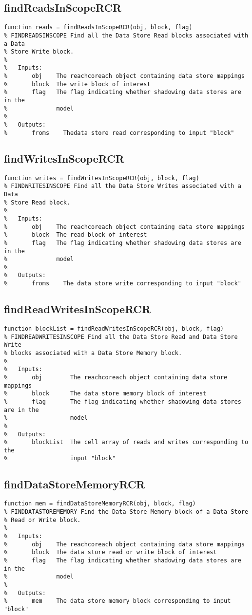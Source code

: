 \documentclass[12pt,letterpaper]{report}
\begin{document}
	\subsection{findReadsInScopeRCR}
\begin{lstlisting}
function reads = findReadsInScopeRCR(obj, block, flag)
% FINDREADSINSCOPE Find all the Data Store Read blocks associated with a Data
% Store Write block.
%
% 	Inputs:
% 		obj    The reachcoreach object containing data store mappings
%       block  The write block of interest
%       flag   The flag indicating whether shadowing data stores are in the
%              model
%
% 	Outputs:
%		froms    Thedata store read corresponding to input "block"
\end{lstlisting}
	\subsection{findWritesInScopeRCR}
\begin{lstlisting}
function writes = findWritesInScopeRCR(obj, block, flag)
% FINDWRITESINSCOPE Find all the Data Store Writes associated with a Data
% Store Read block.
%
% 	Inputs:
% 		obj    The reachcoreach object containing data store mappings
%       block  The read block of interest
%       flag   The flag indicating whether shadowing data stores are in the
%              model
%
% 	Outputs:
%		froms    The data store write corresponding to input "block"
\end{lstlisting}
	\subsection{findReadWritesInScopeRCR}
\begin{lstlisting}
function blockList = findReadWritesInScopeRCR(obj, block, flag)
% FINDREADWRITESINSCOPE Find all the Data Store Read and Data Store Write 
% blocks associated with a Data Store Memory block.
%
% 	Inputs:
% 		obj        The reachcoreach object containing data store mappings
%       block      The data store memory block of interest
%       flag       The flag indicating whether shadowing data stores are in the
%                  model
%
% 	Outputs:
%		blockList  The cell array of reads and writes corresponding to the
%		           input "block"
\end{lstlisting}
	\subsection{findDataStoreMemoryRCR}
\begin{lstlisting}
function mem = findDataStoreMemoryRCR(obj, block, flag)
% FINDDATASTOREMEMORY Find the Data Store Memory block of a Data Store
% Read or Write block.
%
% 	Inputs:
% 		obj    The reachcoreach object containing data store mappings
%       block  The data store read or write block of interest
%       flag   The flag indicating whether shadowing data stores are in the
%              model
%
% 	Outputs:
%		mem    The data store memory block corresponding to input "block"
\end{lstlisting}
	
\end{document}
